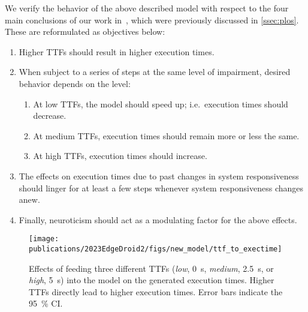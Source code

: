 We verify the behavior of the above described model with respect to the four main conclusions of our work in~\cite{olguinmunoz2021impact}, which were previously discussed in \cref{ssec:plos}.
These are reformulated as objectives below:

\begin{enumerate}
    \item\label{it:ttftoexectime} Higher \glspl{TTF} should result in higher execution times.
    \item\label{it:duration} When subject to a series of steps at the same level of impairment, desired behavior depends on the level:
    \begin{enumerate}
        \item At low \glspl{TTF}, the model should speed up; i.e.\ execution times should decrease.
        \item At medium \glspl{TTF}, execution times should remain more or less the same.
        \item At high \glspl{TTF}, execution times should increase.
    \end{enumerate}
    \item The effects on execution times due to past changes in system responsiveness should linger for at least a few steps whenever system responsiveness changes anew.
    \item\label{it:neuro} Finally, neuroticism should act as a modulating factor for the above effects.
\end{enumerate}

\begin{figure}
    \centering
    \texttt{[image: publications/2023EdgeDroid2/figs/new\_model/ttf\_to\_exectime]}
    \caption{%
        Effects of feeding three different \glspl{TTF} (\emph{low}, \SI{0}{\second}, \emph{medium}, \SI{2.5}{\second}, or \emph{high}, \SI{5}{\second}) into the model on the generated execution times.
        Higher \glspl{TTF} directly lead to higher execution times.
        Error bars indicate the \SI{95}{\percent} \gls{CI}.
    }\label{fig:ttf_to_exectime}
\end{figure}

